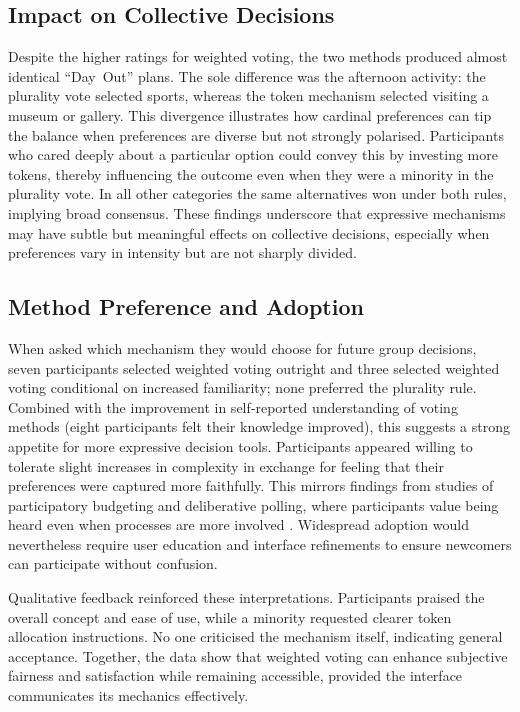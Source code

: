 \subsection*{Impact on Collective Decisions}
Despite the higher ratings for weighted voting, the two methods produced almost identical ``Day~Out'' plans.  The sole difference was the afternoon activity: the plurality vote selected sports, whereas the token mechanism selected visiting a museum or gallery.  This divergence illustrates how cardinal preferences can tip the balance when preferences are diverse but not strongly polarised.  Participants who cared deeply about a particular option could convey this by investing more tokens, thereby influencing the outcome even when they were a minority in the plurality vote.  In all other categories the same alternatives won under both rules, implying broad consensus.  These findings underscore that expressive mechanisms may have subtle but meaningful effects on collective decisions, especially when preferences vary in intensity but are not sharply divided.

\subsection*{Method Preference and Adoption}
When asked which mechanism they would choose for future group decisions, seven participants selected weighted voting outright and three selected weighted voting conditional on increased familiarity; none preferred the plurality rule.  Combined with the improvement in self‑reported understanding of voting methods (eight participants felt their knowledge improved), this suggests a strong appetite for more expressive decision tools.  Participants appeared willing to tolerate slight increases in complexity in exchange for feeling that their preferences were captured more faithfully.  This mirrors findings from studies of participatory budgeting and deliberative polling, where participants value being heard even when processes are more involved \cite{Talpin2011PB}.  Widespread adoption would nevertheless require user education and interface refinements to ensure newcomers can participate without confusion.

Qualitative feedback reinforced these interpretations.  Participants praised the overall concept and ease of use, while a minority requested clearer token allocation instructions.  No one criticised the mechanism itself, indicating general acceptance.  Together, the data show that weighted voting can enhance subjective fairness and satisfaction while remaining accessible, provided the interface communicates its mechanics effectively.

